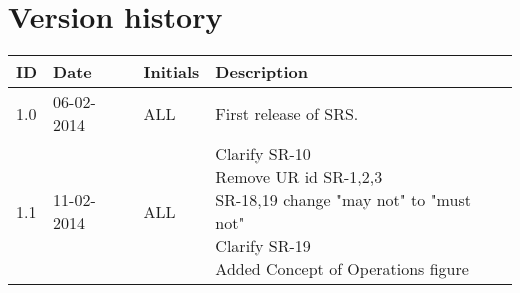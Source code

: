 \documentclass[Main]{subfiles}
\begin{document}
\section*{Version history}

\begin{tabular}{p{} p{} p{} p{}}
\hline
\textbf{ID} & \textbf{Date} & \textbf{Initials} & \textbf{Description}
\\
\hline
1.0 & 06-02-2014 & ALL & First release of SRS.
\\ 
1.1 & 11-02-2014 & ALL & \parbox[t]{0.7\textwidth}{
Clarify SR-10 \\
Remove UR id SR-1,2,3 \\
SR-18,19 change "may not" to "must not" \\
Clarify SR-19\\
Added Concept of Operations figure\\
}
\\ \hline 
\end{tabular} 
\end{document}
